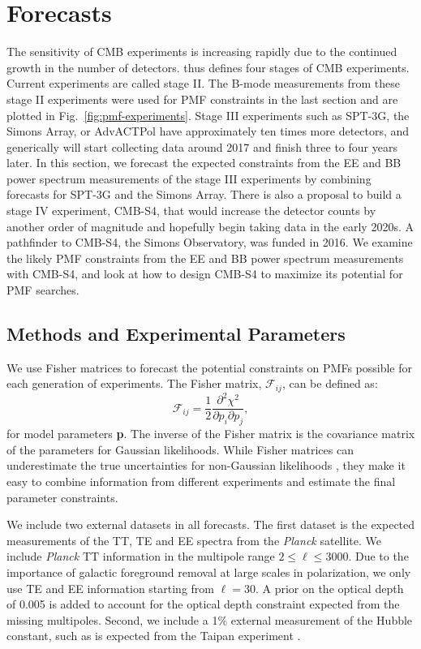 \documentclass[apj]{emulateapj}
\newcommand{\be}{\begin{equation}}
\newcommand{\ee}{\end{equation}}
\newcommand{\planck}{{\sl Planck}}
\begin{document}
\section{Forecasts}
\label{sec:forecasts}

The sensitivity of CMB experiments is increasing rapidly due to the continued growth in the number of detectors. 
\citet{abazajian16} thus defines four stages of CMB experiments. 
Current experiments are called stage II. 
The B-mode measurements from these stage II experiments were  used for PMF constraints in the last section and are plotted in Fig.~\ref{fig:pmf-experiments}. 
Stage III experiments such as SPT-3G, the Simons Array, or AdvACTPol \citep{benson14,suzuki16,henderson16} have approximately ten times more detectors, and generically will start collecting data around 2017 and finish three to four years later.
In this section, we forecast the expected constraints from the EE and BB power spectrum measurements  of the stage III experiments by combining forecasts for SPT-3G and the Simons Array. 
There is also a proposal to build a stage IV experiment, CMB-S4, that would increase the detector counts by another order of magnitude and hopefully begin taking data in the early 2020s. 
A pathfinder to CMB-S4, the Simons Observatory, was funded in 2016.
We examine the likely PMF constraints from the EE and BB power spectrum measurements with CMB-S4, and look at how to design CMB-S4 to maximize its potential for PMF searches.





\subsection{Methods and Experimental Parameters}

We use Fisher matrices to forecast the potential constraints on PMFs possible for each generation of experiments. 
The Fisher matrix, $\mathcal{F}_{ij}$, can be defined as:
\be
\mathcal{F}_{ij} = \frac{1}{2} \frac{\partial^2 \chi^2}{\partial p_i \partial p_j},
\ee
for model parameters \textbf{p}. 
The inverse of the Fisher matrix is the covariance matrix of the parameters for Gaussian likelihoods. 
While Fisher matrices can underestimate the true uncertainties for non-Gaussian likelihoods \citep[see e.g.,][]{wolz12}, they 
 make it easy to combine information from different experiments and estimate the final parameter constraints.  

We include two external datasets in all forecasts. 
The first dataset is the expected measurements of the  TT, TE and EE spectra from the \planck{} satellite. 
We include \planck{} TT information in the multipole range $2\le \ell \le 3000$. 
Due to the importance of galactic foreground removal at large scales in polarization, we only use TE and EE information starting from $\ell = 30$. 
A prior on the optical depth of 0.005 is added to account for the optical depth constraint expected from the missing multipoles. 
Second, we include a 1\% external measurement of the Hubble constant, such as is expected from the Taipan experiment \citep{kuehn14}. 
\end{document}

